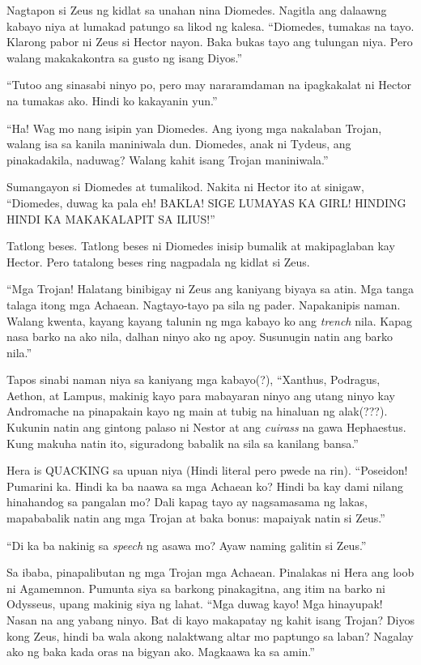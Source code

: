 \documentclass[12pt,letterpaper]{report}
\begin{document}
Nagtapon si Zeus ng kidlat sa unahan nina Diomedes. Nagitla ang dalaawng kabayo niya at lumakad patungo sa likod ng kalesa. ``Diomedes, tumakas na tayo. Klarong pabor ni Zeus si Hector nayon. Baka bukas tayo ang tulungan niya. Pero walang makakakontra sa gusto ng isang Diyos.''

``Tutoo ang sinasabi ninyo po, pero may nararamdaman na ipagkakalat ni Hector na tumakas ako. Hindi ko kakayanin yun.''

``Ha! Wag mo nang isipin yan Diomedes. Ang iyong mga nakalaban Trojan, walang isa sa kanila maniniwala dun. Diomedes, anak ni Tydeus, ang pinakadakila, naduwag? Walang kahit isang Trojan maniniwala.''

Sumangayon si Diomedes at tumalikod. Nakita ni Hector ito at sinigaw, ``Diomedes, duwag ka pala eh! BAKLA! SIGE LUMAYAS KA GIRL! HINDING HINDI KA MAKAKALAPIT SA ILIUS!''

Tatlong beses. Tatlong beses ni Diomedes inisip bumalik at makipaglaban kay Hector. Pero tatalong beses ring nagpadala ng kidlat si Zeus.

``Mga Trojan! Halatang binibigay ni Zeus ang kaniyang biyaya sa atin. Mga tanga talaga itong mga Achaean. Nagtayo-tayo pa sila ng pader. Napakanipis naman. Walang kwenta, kayang kayang talunin ng mga kabayo ko ang \textit{trench} nila. Kapag nasa barko na ako nila, dalhan ninyo ako ng apoy. Susunugin natin ang barko nila.''

Tapos sinabi naman niya sa kaniyang mga kabayo(?), ``Xanthus, Podragus, Aethon, at Lampus, makinig kayo para mabayaran ninyo ang utang ninyo kay Andromache na pinapakain kayo ng main at tubig na hinaluan ng alak(???). Kukunin natin ang gintong palaso ni Nestor at ang \textit{cuirass} na gawa Hephaestus. Kung makuha natin ito, siguradong babalik na sila sa kanilang bansa.''

Hera is QUACKING sa upuan niya (Hindi literal pero pwede na rin). ``Poseidon! Pumarini ka. Hindi ka ba naawa sa mga Achaean ko? Hindi ba kay dami nilang hinahandog sa pangalan mo? Dali kapag tayo ay nagsamasama ng lakas, mapababalik natin ang mga Trojan at baka bonus: mapaiyak natin si Zeus.''

``Di ka ba nakinig sa \textit{speech} ng asawa mo? Ayaw naming galitin si Zeus.''

Sa ibaba, pinapalibutan ng mga Trojan mga Achaean. Pinalakas ni Hera ang loob ni Agamemnon. Pumunta siya sa barkong pinakagitna, ang itim na barko ni Odysseus, upang makinig siya ng lahat. ``Mga duwag kayo! Mga hinayupak! Nasan na ang yabang ninyo. Bat di kayo makapatay ng kahit isang Trojan? Diyos kong Zeus, hindi ba wala akong nalaktwang altar mo paptungo sa laban? Nagalay ako ng baka kada oras na bigyan ako. Magkaawa ka sa amin.''
\end{document}
